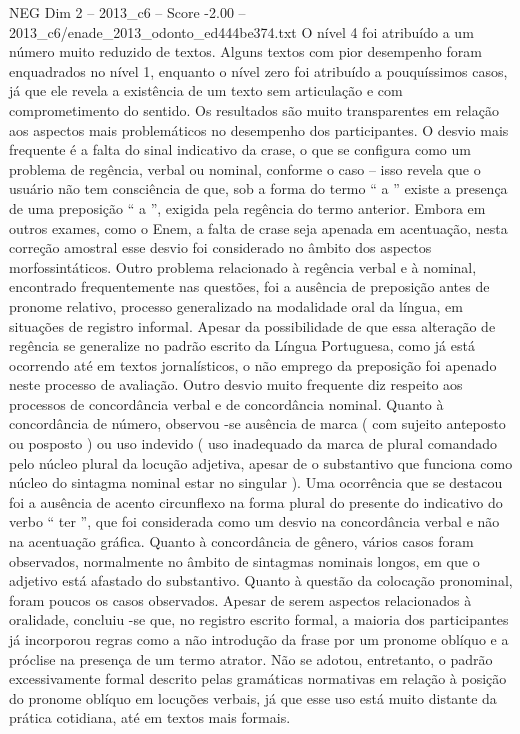 \begin{textsample}{NEG Dim 2 – 2013\_c6 – Score -2.00 – 2013\_c6/enade\_2013\_odonto\_ed444be374.txt}
O nível 4 foi atribuído a um número muito reduzido de textos.
Alguns textos com pior desempenho foram enquadrados no nível 1, enquanto o nível zero foi atribuído a pouquíssimos casos, já que ele revela a existência de um texto sem articulação e com comprometimento do sentido.
Os resultados são muito transparentes em relação aos aspectos mais problemáticos no desempenho dos participantes.
O desvio mais frequente é a falta do sinal indicativo da crase, o que se configura como um problema de regência, verbal ou nominal, conforme o caso – isso revela que o usuário não tem consciência de que, sob a forma do termo “ a ” existe a presença de uma preposição “ a ”, exigida pela regência do termo anterior.
Embora em outros exames, como o Enem, a falta de crase seja apenada em acentuação, nesta correção amostral esse desvio foi considerado no âmbito dos aspectos morfossintáticos.
Outro problema relacionado à regência verbal e à nominal, encontrado frequentemente nas questões, foi a ausência de preposição antes de pronome relativo, processo generalizado na modalidade oral da língua, em situações de registro informal.
Apesar da possibilidade de que essa alteração de regência se generalize no padrão escrito da Língua Portuguesa, como já está ocorrendo até em textos jornalísticos, o não emprego da preposição foi apenado neste processo de avaliação.
Outro desvio muito frequente diz respeito aos processos de concordância verbal e de concordância nominal.
Quanto à concordância de número, observou -se ausência de marca ( com sujeito anteposto ou posposto ) ou uso indevido ( uso inadequado da marca de plural comandado pelo núcleo plural da locução adjetiva, apesar de o substantivo que funciona como núcleo do sintagma nominal estar no singular ).
Uma ocorrência que se destacou foi a ausência de acento circunflexo na forma plural do presente do indicativo do verbo “ ter ”, que foi considerada como um desvio na concordância verbal e não na acentuação gráfica.
Quanto à concordância de gênero, vários casos foram observados, normalmente no âmbito de sintagmas nominais longos, em que o adjetivo está afastado do substantivo.
Quanto à questão da colocação pronominal, foram poucos os casos observados.
Apesar de serem aspectos relacionados à oralidade, concluiu -se que, no registro escrito formal, a maioria dos participantes já incorporou regras como a não introdução da frase por um pronome oblíquo e a próclise na presença de um termo atrator.
Não se adotou, entretanto, o padrão excessivamente formal descrito pelas gramáticas normativas em relação à posição do pronome oblíquo em locuções verbais, já que esse uso está muito distante da prática cotidiana, até em textos mais formais.

\end{textsample}
